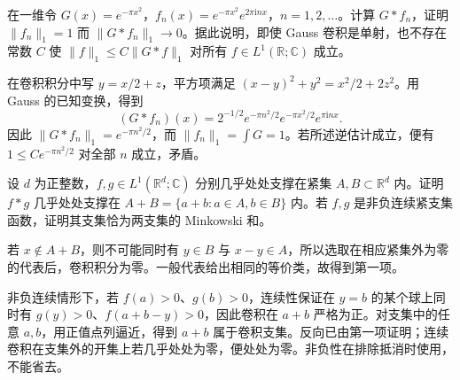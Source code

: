 \begin{optionalexercise}\label{b2:ex:03-unstable-deconvolution}
在一维令 \(G(x)=e^{-\pi x^2}\)，\(f_n(x)=e^{-\pi x^2}e^{2\pi\mathrm{i}nx}\)，\(n=1,2,\ldots\)。计算 \(G*f_n\)，证明 \(\|f_n\|_1=1\) 而 \(\|G*f_n\|_1\to0\)。据此说明，即使 Gauss 卷积是单射，也不存在常数 \(C\) 使 \(\|f\|_1\leq C\|G*f\|_1\) 对所有 \(f\in L^1(\mathbb R;\mathbb C)\) 成立。
\end{optionalexercise}
\begin{solution}
在卷积积分中写 \(y=x/2+z\)，平方项满足 \((x-y)^2+y^2=x^2/2+2z^2\)。用 Gauss 的已知变换，得到
\[
 (G*f_n)(x)=2^{-1/2}e^{-\pi n^2/2}e^{-\pi x^2/2}e^{\pi\mathrm{i}nx}.
\]
因此 \(\|G*f_n\|_1=e^{-\pi n^2/2}\)，而 \(\|f_n\|_1=\int G=1\)。若所述逆估计成立，便有 \(1\leq Ce^{-\pi n^2/2}\) 对全部 \(n\) 成立，矛盾。
\end{solution}

\begin{exercise}\label{b2:ex:03-support-convolution}
设 \(d\) 为正整数，\(f,g\in L^1(\mathbb R^d;\mathbb C)\) 分别几乎处处支撑在紧集 \(A,B\subset\mathbb R^d\) 内。证明 \(f*g\) 几乎处处支撑在 \(A+B=\{a+b:a\in A,b\in B\}\) 内。若 \(f,g\) 是非负连续紧支集函数，证明其支集恰为两支集的 Minkowski 和。
\end{exercise}
\begin{solution}
若 \(x\notin A+B\)，则不可能同时有 \(y\in B\) 与 \(x-y\in A\)，所以选取在相应紧集外为零的代表后，卷积积分为零。一般代表给出相同的等价类，故得到第一项。

非负连续情形下，若 \(f(a)>0\)、\(g(b)>0\)，连续性保证在 \(y=b\) 的某个球上同时有 \(g(y)>0\)、\(f(a+b-y)>0\)，因此卷积在 \(a+b\) 严格为正。对支集中的任意 \(a,b\)，用正值点列逼近，得到 \(a+b\) 属于卷积支集。反向已由第一项证明；连续卷积在支集外的开集上若几乎处处为零，便处处为零。非负性在排除抵消时使用，不能省去。
\end{solution}
